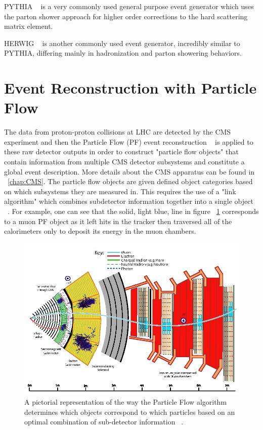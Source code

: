 PYTHIA ~\cite{Sjostrand:2006za} is a very commonly used general purpose event generator which uses the parton shower approach for higher order corrections to the hard scattering matrix element.

HERWIG  ~\cite{herwigpp} is another commonly used event generator, incredibly similar to PYTHIA, differing mainly in hadronization and parton showering behaviors.


\section{Event Reconstruction with Particle Flow}\label{sec:PFReco}


The data from proton-proton collisions at LHC are detected by the CMS experiment and then the Particle Flow (PF) event reconstruction ~\cite{Sirunyan:2017ulk} is applied to these raw detector outputs in order to construct "particle flow objects" that contain information from multiple CMS detector subsystems and constitute a global event description. More details about the CMS apparatus can be found in ~\ref{chap:CMS}. The particle flow objects are given defined object categories based on which subsystems they are measured in. This requires the use of a "link algorithm" which combines subdetector information together into a single object ~\cite{Sirunyan:2017ulk}. For example, one can see that the solid, light blue, line in figure ~\ref{fig:cmsPF} corresponds to a muon PF object as it left hits in the tracker then traversed all of the calorimeters only to deposit its energy in the muon chambers.


\begin{figure}[htb]
\centering
\includegraphics[width=1.0\textwidth]{Chapter-1/cmsPflow.png}
\caption{A pictorial representation of the way the Particle Flow algorithm determines which objects correspond to which particles based on an optimal combination of sub-detector information ~\cite{Sirunyan:2017ulk}.}
\label{fig:cmsPF}
\end{figure}


